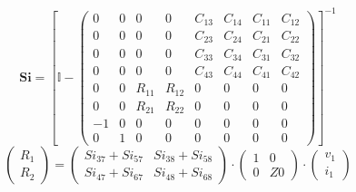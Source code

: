 \documentclass[10pt]{article} \usepackage{amsmath} \usepackage{bbold}
\begin{document}
\[ \mathbf{Si} = \left[ \mathbb{I}  - \left(\begin{array}{cccccccc} 0
& 0 & 0 & 0 & C_{13} & C_{14} & C_{11} & C_{12} \\ 0 & 0 & 0 & 0 &
C_{23} & C_{24} & C_{21} & C_{22} \\ 0 & 0 & 0 & 0 & C_{33} & C_{34} &
C_{31} & C_{32} \\ 0 & 0 & 0 & 0 & C_{43} & C_{44} & C_{41} & C_{42}
\\ 0 & 0 & R_{11} & R_{12} & 0 & 0 & 0 & 0 \\ 0 & 0 & R_{21} & R_{22}
& 0 & 0 & 0 & 0 \\ -1 & 0 & 0 & 0 & 0 & 0 & 0 & 0 \\ 0 & 1 & 0 & 0 & 0
& 0 & 0 & 0 \end{array}\right) \right]^{-1} \]
\[ \left(\begin{array}{c} R_{1} \\ R_{2}
\end{array}\right)=\left(\begin{array}{cc} Si_{37} + Si_{57} & Si_{38}
+ Si_{58} \\ Si_{47} + Si_{67} & Si_{48} + Si_{68}
\end{array}\right)\cdot \left(\begin{array}{cc} 1 & 0 \\ 0 & Z0
\end{array}\right)\cdot \left(\begin{array}{c} v_{1} \\ i_{1}
\end{array}\right) \]
\end{document}
